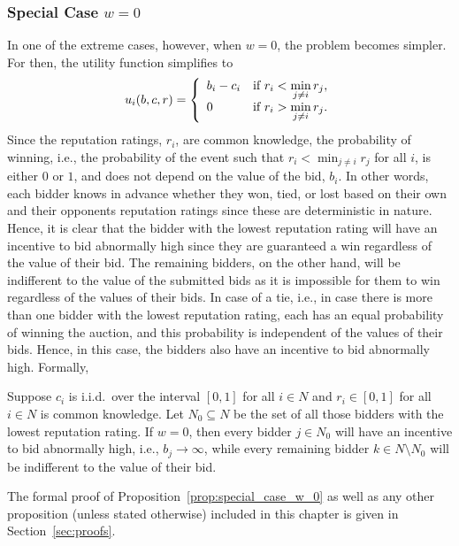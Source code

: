 \subsubsection{Special Case $w=0$} %
\label{ssub:special_case_w_0_}
In one of the extreme cases, however, when $w=0$, the problem becomes simpler. For then, the utility function simplifies to
\begin{equation}
	\label{eq:utility_w_0}
	u_i(b,c,r) = \left\{
	\begin{array}{l l}
		b_i-c_i &\text{if } r_i < \displaystyle\min_{j\neq i} r_j,\\
		0 &\text{if } r_i > \displaystyle\min_{j\neq i} r_j.
	\end{array}\right.
\end{equation}
Since the reputation ratings, $r_i$, are common knowledge, the probability of winning, i.e., the probability of the event such that $r_i<\min_{j\neq i}r_j$ for all $i$, is either $0$ or $1$, and does not depend on the value of the bid, $b_i$. In other words, each bidder knows in advance whether they won, tied, or lost based on their own and their opponents reputation ratings since these are deterministic in nature. Hence, it is clear that the bidder with the lowest reputation rating will have an incentive to bid abnormally high since they are guaranteed a win regardless of the value of their bid. The remaining bidders, on the other hand, will be indifferent to the value of the submitted bids as it is impossible for them to win regardless of the values of their bids. In case of a tie, i.e., in case there is more than one bidder with the lowest reputation rating, each has an equal probability of winning the auction, and this probability is independent of the values of their bids. Hence, in this case, the bidders also have an incentive to bid abnormally high. Formally,
\begin{proposition}
\label{prop:special_case_w_0}
Suppose $c_i$ is i.i.d.~over the interval $[0,1]$ for all $i\in N$ and $r_i\in [0,1]$ for all $i\in N$ is common knowledge. Let $N_0\subseteq N$ be the set of all those bidders with the lowest reputation rating. If $w=0$, then every bidder $j\in N_0$ will have an incentive to bid abnormally high, i.e., $b_j\rightarrow\infty$, while every remaining bidder $k\in N\setminus N_0$ will be indifferent to the value of their bid.
\end{proposition}
\noindent The formal proof of Proposition~\ref{prop:special_case_w_0} as well as any other proposition (unless stated otherwise) included in this chapter is given in Section~\ref{sec:proofs}.

